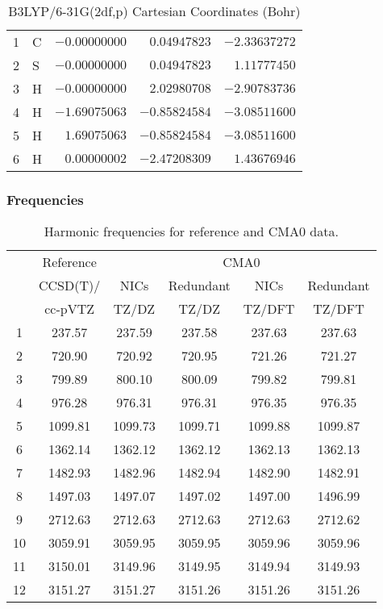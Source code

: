 \documentclass[10pt,oneside]{article}
\begin{document}
\begin{table}[h]
\centering
\caption{B3LYP/6-31G(2df,p) Cartesian Coordinates (Bohr)}
\begin{tabular}{llrrr}
\toprule
1  & C  & $-0.00000000$ & $ 0.04947823$ & $-2.33637272$ \\
2  & S  & $-0.00000000$ & $ 0.04947823$ & $ 1.11777450$ \\
3  & H  & $-0.00000000$ & $ 2.02980708$ & $-2.90783736$ \\
4  & H  & $-1.69075063$ & $-0.85824584$ & $-3.08511600$ \\
5  & H  & $ 1.69075063$ & $-0.85824584$ & $-3.08511600$ \\
6  & H  & $ 0.00000002$ & $-2.47208309$ & $ 1.43676946$ \\
\bottomrule
\end{tabular}
\end{table}

\begin{table}[h!]
\subsubsection*{Frequencies}
\centering
\caption{Harmonic frequencies for reference and CMA0 data.}
\begin{tabular}{cccccc}
\toprule
{} & Reference & \multicolumn{4}{c}{CMA0} \\
{} &  CCSD(T)/ &    NICs &  Redundant &    NICs & Redundant \\
{} &   cc-pVTZ &   TZ/DZ &      TZ/DZ &  TZ/DFT &    TZ/DFT \\
\midrule
1  &    237.57 &  237.59 &     237.58 &  237.63 &    237.63 \\
2  &    720.90 &  720.92 &     720.95 &  721.26 &    721.27 \\
3  &    799.89 &  800.10 &     800.09 &  799.82 &    799.81 \\
4  &    976.28 &  976.31 &     976.31 &  976.35 &    976.35 \\
5  &   1099.81 & 1099.73 &    1099.71 & 1099.88 &   1099.87 \\
6  &   1362.14 & 1362.12 &    1362.12 & 1362.13 &   1362.13 \\
7  &   1482.93 & 1482.96 &    1482.94 & 1482.90 &   1482.91 \\
8  &   1497.03 & 1497.07 &    1497.02 & 1497.00 &   1496.99 \\
9  &   2712.63 & 2712.63 &    2712.63 & 2712.63 &   2712.62 \\
10 &   3059.91 & 3059.95 &    3059.95 & 3059.96 &   3059.96 \\
11 &   3150.01 & 3149.96 &    3149.95 & 3149.94 &   3149.93 \\
12 &   3151.27 & 3151.27 &    3151.26 & 3151.26 &   3151.26 \\
\bottomrule
\end{tabular}
\end{table}
\end{document}

